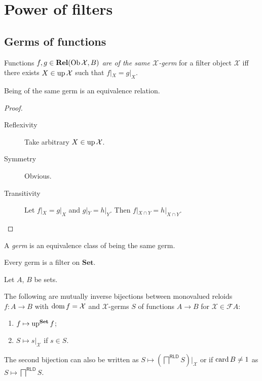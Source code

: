 \chapter{Power of filters}

\section{Germs of functions}

\begin{defn}
  Functions $f, g \in \mathbf{Rel} (\operatorname{Ob} \mathcal{X} , B)$
  \emph{are of the same $\mathcal{X}$-germ} for a filter object
  $\mathcal{X}$ iff there exists $X \in \operatorname{up} \mathcal{X}$ such that $f|_X
  = g|_X$.
\end{defn}

\begin{prop}
  Being of the same germ is an equivalence relation.
\end{prop}

\begin{proof}
  ~
  \begin{description}
    \item[Reflexivity] Take arbitrary $X \in \operatorname{up} \mathcal{X}$.
    
    \item[Symmetry] Obvious.
    
    \item[Transitivity] Let $f|_X = g|_X$ and $g|_Y = h|_Y$. Then $f|_{X \cap
    Y} = h|_{X \cap Y}$.
  \end{description}
\end{proof}

\begin{defn}
  A \emph{germ} is an equivalence class of being the same germ.
\end{defn}

\begin{obvious}
Every germ is a filter on $\mathbf{Set}$.
\end{obvious}

\begin{thm}
  Let $A$, $B$ be sets.

  The following are mutually inverse bijections between monovalued reloids $f
  : A \rightarrow B$ with $\operatorname{dom} f = \mathcal{X}$ and $\mathcal{X}$-germs
  $S$ of functions $A \rightarrow B$ for $\mathcal{X} \in \mathscr{F} A$:
  \begin{enumerate}
    \item $f \mapsto \operatorname{up}^{\mathbf{Set}} f$;
    \item $S \mapsto s|_{\mathcal{X}}$ if $s\in S$.
  \end{enumerate}
  The second bijection can also be written as $S \mapsto \left(\bigsqcap^{\mathsf{RLD}} S\right)|_{\mathcal{X}}$ or
  if $\operatorname{card} B\ne 1$ as $S \mapsto \bigsqcap^{\mathsf{RLD}} S$.
\end{thm}

